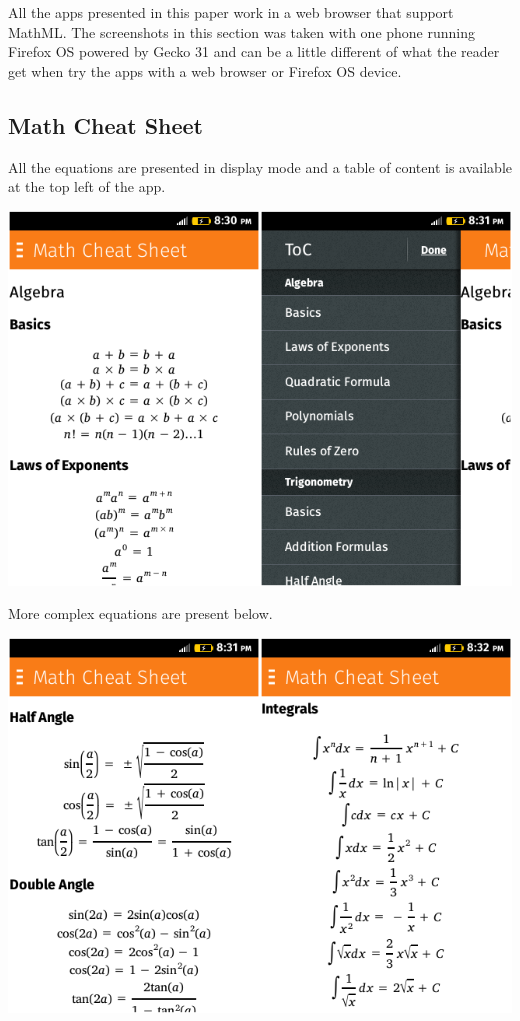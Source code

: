 All the apps presented in this paper work in a web browser that support MathML.
The screenshots in this section was taken with one phone running Firefox OS
powered by Gecko 31 and can be a little different of what the reader get when
try the apps with a web browser or Firefox OS device.

\subsection{Math Cheat Sheet}

All the equations are presented in display mode and a table of content is
available at the top left of the app.

\href{http://r-gaia-cs.github.io/math-cheat-sheet/}{\includegraphics[width=\textwidth]{screenshots/8-math-cheat-sheet-A}}

More complex equations are present below.

\href{http://r-gaia-cs.github.io/math-cheat-sheet/}{\includegraphics[width=\textwidth]{screenshots/8-math-cheat-sheet-B}}

